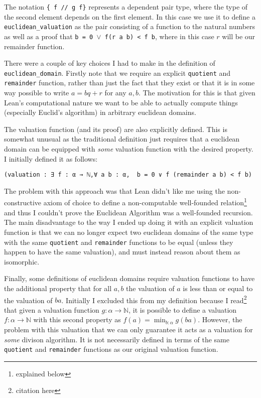 \documentclass{article}
\newcommand{\N}{\ensuremath{\mathbb{N}}}
\renewcommand{\a}{\alpha}
\newcommand{\ct}{\texttt}
\begin{document}
The notation \ct{\{ f // g f\}} represents a dependent pair type, where the type of the second element depends on the first element.
In this case we use it to define a \ct{euclidean\_valuation} as the pair consisting of a function to the natural numbers as well as a proof that \ct{b = 0 $\lor$ f(r a b) < f b}, where in this case $r$ will be our remainder function.

There were a couple of key choices I had to make in the definition of \ct{euclidean\_domain}.
Firstly note that we require an explicit \ct{quotient} and \ct{remainder} function, rather than just the fact that they exist or that it is in some way possible to write $a=bq+r$ for any $a,b$.
The motivation for this is that given Lean's computational nature we want to be able to actually compute things (especially Euclid's algorithm) in arbitrary euclidean domains.

The valuation function (and its proof) are also explicitly defined. This is somewhat unusual as the traditional definition just requires that a euclidean domain can be equipped with \textit{some} valuation function with the desired property. I initially defined it as follows:
\begin{lstlisting}
(valuation : ∃ f : α → ℕ,∀ a b : α,  b = 0 ∨ f (remainder a b) < f b)
\end{lstlisting}
The problem with this approach was that Lean didn't like me using the non-constructive axiom of choice to define a non-computable well-founded relation\footnote{explained below} and thus I couldn't prove the Euclidean Algorithm was a well-founded recursion. 
The main disadvantage to the way I ended up doing it with an explicit valuation function is that we can no longer expect two euclidean domains of the same type with the same \ct{quotient} and \ct{remainder} functions to be equal (unless they happen to have the same valuation), and must instead reason about them as isomorphic.

Finally, some definitions of euclidean domains require valuation functions to have the additional property that for all $a,b$ the valuation of $a$ is less than or equal to the valuation of $ba$. 
Initially I excluded this from my definition because I read\footnote{citation here} that given a valuation function $g:\a \to \N$, it is possible to define a valuation $f:\a \to \N$ with this second property as $f(a)=\min_{b:\a}g(ba)$.
However, the problem with this valuation that we can only guarantee it acts as a valuation for \textit{some} divison algorithm.
It is not necessarily defined in terms of the same \ct{quotient} and \ct{remainder} functions as our original valuation function.
\end{document}
